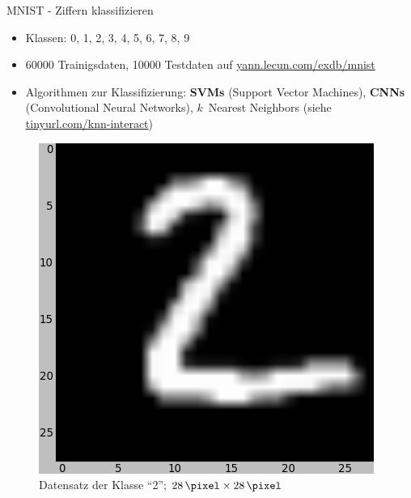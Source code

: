 \documentclass{beamer}
\begin{document}
\begin{frame}{MNIST - Ziffern klassifizieren}
    \begin{minipage}[b]{0.45\linewidth}
        \begin{itemize}
            \item Klassen: 0, 1, 2, 3, 4, 5, 6, 7, 8, 9
            \item \num{60000} Trainigsdaten, \num{10000} Testdaten
                  auf \href{http://yann.lecun.com/exdb/mnist/}{yann.lecun.com/exdb/mnist}
            \item Algorithmen zur Klassifizierung: \textbf{SVMs} (Support Vector Machines),
                  \textbf{CNNs} (Convolutional Neural Networks),
                  $k$~Nearest Neighbors (siehe \href{http://martin-thoma.com/k-nearest-neighbor-classification-interactive-example/}{tinyurl.com/knn-interact})
        \end{itemize}
    \end{minipage}
    \hspace{0.5cm}
    \begin{minipage}[b]{0.45\linewidth}
        \begin{figure}
            \centering
            \includegraphics[width=\textwidth]{../images/mnist-2.png}
            \caption{Datensatz der Klasse \enquote{2}; $\SI{28}{\pixel} \times \SI{28}{\pixel}$}
            \label{fig:spline}
        \end{figure}
    \end{minipage}
\end{frame}
\end{document}
